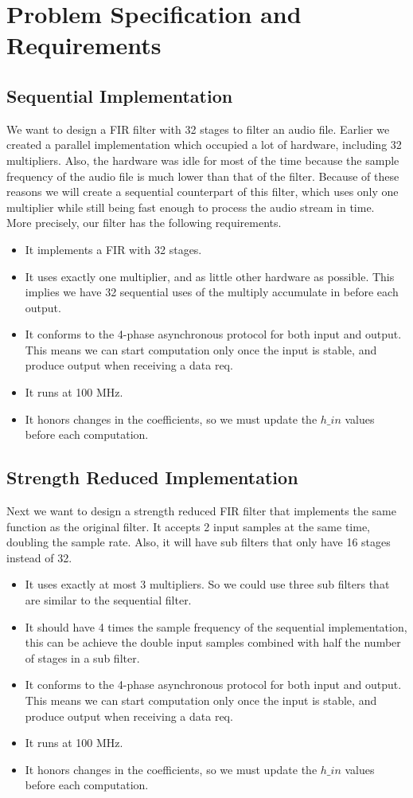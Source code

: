 \section{Problem Specification and Requirements}
\subsection{Sequential Implementation}
We want to design a FIR filter with 32 stages to filter an audio file. Earlier we created a parallel implementation which occupied a lot of hardware, including 32 multipliers. Also, the hardware was idle for most of the time because the sample frequency of the audio file is much lower than that of the filter. Because of these reasons we will create a sequential counterpart of this filter, which uses only one multiplier while still being fast enough to process the audio stream in time. \\
More precisely, our filter has the following requirements.
\begin{itemize}
\item It implements a FIR with 32 stages.
\item It uses exactly one multiplier, and as little other hardware as possible. This implies we have 32 sequential uses of the multiply accumulate in before each output.
\item It conforms to the 4-phase asynchronous protocol for both input and output. This means we can start computation only once the input is stable, and produce output when receiving a data req.
\item It runs at 100 MHz. 
\item It honors changes in the coefficients, so we must update the $h\_in$ values before each computation.

\end{itemize}

\subsection{Strength Reduced Implementation}
Next we want to design a strength reduced FIR filter that implements the same function as the original filter. It accepts 2 input samples at the same time, doubling the sample rate. Also, it will have sub filters that only have 16 stages instead of 32.
\begin{itemize}
\item It uses exactly at most 3 multipliers. So we could use three sub filters that are similar to the sequential filter.
\item It should have 4 times the sample frequency of the sequential implementation, this can be achieve the double input samples combined with half the number of stages in a sub filter.
\item It conforms to the 4-phase asynchronous protocol for both input and output. This means we can start computation only once the input is stable, and produce output when receiving a data req.
\item It runs at 100 MHz. 
\item It honors changes in the coefficients, so we must update the $h\_in$ values before each computation.

\end{itemize}